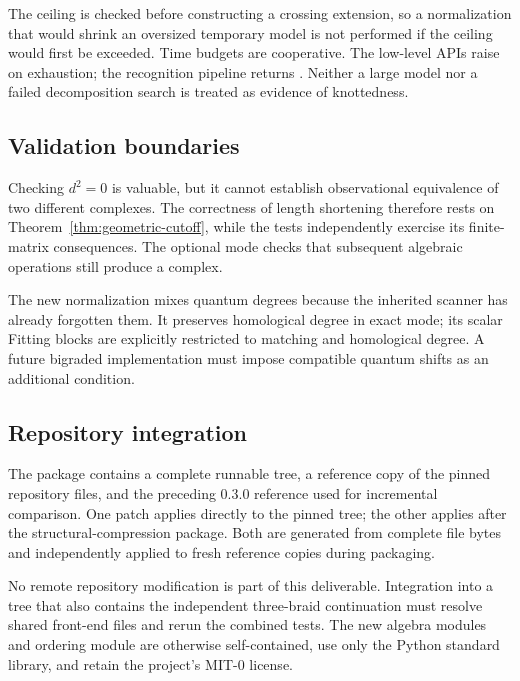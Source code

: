 The  ceiling is checked before constructing a crossing
extension, so a normalization that would shrink an oversized temporary model
is not performed if the ceiling would first be exceeded. Time budgets are
cooperative. The low-level APIs raise  on exhaustion; the
recognition pipeline returns \UNKNOWN. Neither a large model nor a failed
decomposition search is treated as evidence of knottedness.

\subsection{Validation boundaries}
Checking $d^2=0$ is valuable, but it cannot establish observational equivalence
of two different complexes. The correctness of length shortening therefore
rests on Theorem~\ref{thm:geometric-cutoff}, while the tests independently
exercise its finite-matrix consequences. The optional 
mode checks that subsequent algebraic operations still produce a complex.

The new normalization mixes quantum degrees because the inherited scanner
has already forgotten them. It preserves homological degree in exact mode;
its scalar Fitting blocks are explicitly restricted to matching and
homological degree. A future bigraded implementation must impose compatible
quantum shifts as an additional condition.

\subsection{Repository integration}
The package contains a complete runnable  tree, a reference copy
of the pinned repository files, and the preceding 0.3.0 reference used for
incremental comparison. One patch applies directly to the pinned
 tree; the other applies after the
structural-compression package. Both are generated from complete file bytes
and independently applied to fresh reference copies during packaging.

No remote repository modification is part of this deliverable. Integration
into a tree that also contains the independent three-braid continuation must
resolve shared front-end files and rerun the combined tests. The new algebra
modules and ordering module are otherwise self-contained, use only the
Python standard library, and retain the project's MIT-0 license.
